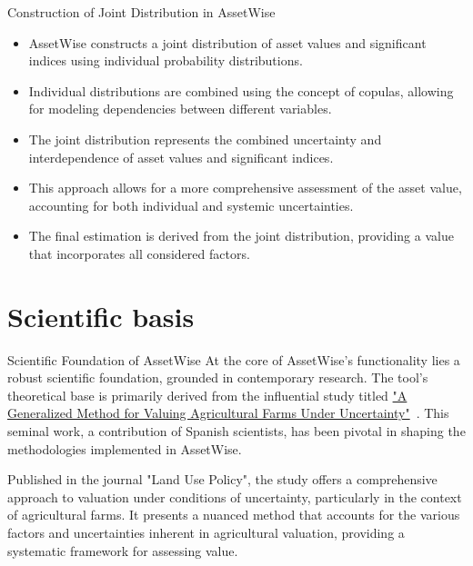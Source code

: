 \documentclass{beamer}
\begin{document}
\begin{frame}{Construction of Joint Distribution in AssetWise}
	\begin{itemize}
		\item AssetWise constructs a joint distribution of asset values and significant indices using individual probability distributions.
		\item Individual distributions are combined using the concept of copulas, allowing for modeling dependencies between different variables.
		\item The joint distribution represents the combined uncertainty and interdependence of asset values and significant indices.
		\item This approach allows for a more comprehensive assessment of the asset value, accounting for both individual and systemic uncertainties.
		\item The final estimation is derived from the joint distribution, providing a value that incorporates all considered factors.
	\end{itemize}
\end{frame}

\section{Scientific basis}

\begin{frame}{Scientific Foundation of AssetWise}
	At the core of AssetWise's functionality lies a robust scientific foundation, grounded in contemporary research. The tool's theoretical base is primarily derived from the influential study titled \href{https://www.sci-hub.ru/10.1016/j.landusepol.2017.04.008}{"A Generalized Method for Valuing Agricultural Farms Under Uncertainty"}~\cite{Garc_a_2017}. This seminal work, a contribution of Spanish scientists, has been pivotal in shaping the methodologies implemented in AssetWise.
	
	Published in the journal "Land Use Policy", the study offers a comprehensive approach to valuation under conditions of uncertainty, particularly in the context of agricultural farms. It presents a nuanced method that accounts for the various factors and uncertainties inherent in agricultural valuation, providing a systematic framework for assessing value.
\end{frame}
\end{document}
